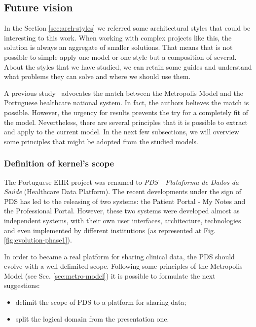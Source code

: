

\subsection{Future vision}

In the Section \ref{sec:arch-styles} we referred some architectural styles that could be interesting to this work. When working with complex projects like this, the solution is always an aggregate of smaller solutions. That means that is not possible to simple apply one model or one style but a composition of several. About the styles that we have studied, we can retain some guides and understand what problems they can solve and where we should use them.

A previous study~\citep{Carvalho2011a} advocates the match between the Metropolis Model and the Portuguese healthcare national system. In fact, the authors believes the match is possible. However, the urgency for results prevents the try for a completely fit of the model. Nevertheless, there are several principles that it is possible to extract and apply to the current model. In the next few subsections, we will overview some principles that might be adopted from the studied models.


\subsubsection{Definition of kernel's scope}

The Portuguese EHR project was renamed to \textit{PDS - Plataforma de Dados da Saúde} (Healthcare Data Platform). The recent developments under the sign of PDS has led to the releasing of two systems: the Patient Portal - My Notes and the Professional Portal. However, these two systems were developed almost as independent systems, with their own user interfaces, architecture, technologies and even implemented by different institutions (as represented at Fig. \ref{fig:evolution-phase1}).


In order to became a real platform for sharing clinical data, the PDS should evolve with a well delimited scope. Following some principles of the Metropolis Model (see Sec. \ref{sec:metro-model}) it is possible to formulate the next suggestions:
\begin{itemize}
\item delimit the scope of PDS to a platform for sharing data;
\item split the logical domain from the presentation one.
\end{itemize}

